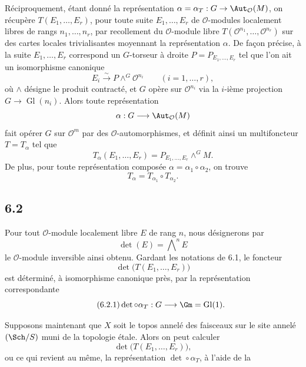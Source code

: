 \documentclass[11pt]{article}
\providecommand{\Gl}{\operatorname{Gl}}
\begin{document}
Réciproquement, étant donné la représentation \(\alpha=\alpha_T:G\to\Aut_{\mathcal O}(M)\), on récupère \(T(E_1,\ldots,E_r)\), pour toute suite \(E_1,\ldots,E_r\) de \(\mathcal O\)-modules localement libres de rangs \(n_1,\ldots,n_r\), par recollement du \(\mathcal O\)-module libre \(T(\mathcal O^{n_1},\ldots,\mathcal O^{n_r})\) sur des cartes locales trivialisantes moyennant la représentation \(\alpha\). De façon précise, à la suite \(E_1,\ldots,E_r\) correspond un \(G\)-torseur à droite \(P=P_{E_1,\ldots,E_r}\) tel que l'on ait un isomorphisme canonique
\begin{equation}\tag{6.1.3}
 E_i\xrightarrow{\sim}P\wedge^G\mathcal O^{n_i}\qquad(i=1,\ldots,r),
\end{equation}
où \(\wedge\) désigne le produit contracté, et \(G\) opère sur \(\mathcal O^{n_i}\) via la \(i\)-ième projection \(G\to\Gl(n_i)\). Alors toute représentation
\[
 \alpha:G\longrightarrow\Aut_{\mathcal O}(M)
\]
fait opérer \(G\) sur \(\mathcal O^m\) par des \(\mathcal O\)-automorphismes, et définit ainsi un multifoncteur \(T=T_\alpha\) tel que
\begin{equation}\tag{6.1.4}
 T_\alpha(E_1,\ldots,E_r)=P_{E_1,\ldots,E_r}\wedge^G M.
\end{equation}
De plus, pour toute représentation composée \(\alpha=\alpha_1\circ\alpha_2\), on trouve
\begin{equation}\tag{6.1.5}
 T_\alpha=T_{\alpha_1}\circ T_{\alpha_2}.
\end{equation}

\subsection*{6.2}
Pour tout \(\mathcal O\)-module localement libre \(E\) de rang \(n\), nous désignerons par
\[
 \det(E)=\bigwedge\nolimits^n E
\]
le \(\mathcal O\)-module inversible ainsi obtenu. Gardant les notations de 6.1, le foncteur
\[
 \det\bigl(T(E_1,\ldots,E_r)\bigr)
\]
est déterminé, à isomorphisme canonique près, par la représentation correspondante
\begin{equation}\tag{6.2.1}
 \det\circ\alpha_T:G\longrightarrow\Gm=\Gl(1).
\end{equation}

Supposons maintenant que \(X\) soit le topos annelé des faisceaux sur le site annelé \((\Sch/S)\) muni de la topologie étale. Alors on peut calculer
\[
 \det\bigl(T(E_1,\ldots,E_r)\bigr),
\]
ou ce qui revient au même, la représentation \(\det\circ\alpha_T\), à l'aide de la
\end{document}
